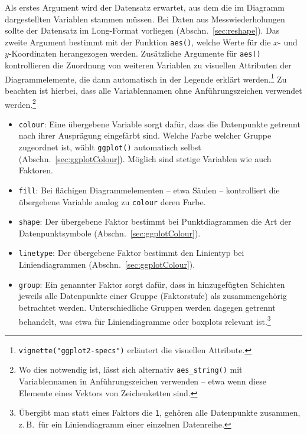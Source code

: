 Als erstes Argument wird der Datensatz erwartet, aus dem die im Diagramm dargestellten Variablen stammen müssen. Bei Daten aus Messwiederholungen sollte der Datensatz im Long-Format vorliegen (Abschn.\ \ref{sec:reshape}). Das zweite Argument bestimmt mit der Funktion \lstinline!aes()!, welche Werte für die $x$- und $y$-Koordinaten herangezogen werden. Zusätzliche Argumente für \lstinline!aes()! kontrollieren die Zuordnung von weiteren Variablen zu visuellen Attributen der Diagrammelemente, die dann automatisch in der Legende erklärt werden.\footnote{\lstinline!vignette("ggplot2-specs")! erläutert die visuellen Attribute.} Zu beachten ist hierbei, dass alle Variablennamen ohne Anführungszeichen verwendet werden.\footnote{Wo dies notwendig ist, lässt sich alternativ \lstinline!aes_string()! mit Variablennamen in Anführungszeichen verwenden -- etwa wenn diese Elemente eines Vektors von Zeichenketten sind.}
\begin{itemize}
\item \lstinline!colour!: Eine übergebene Variable sorgt dafür, dass die Datenpunkte getrennt nach ihrer Ausprägung eingefärbt sind. Welche Farbe welcher Gruppe zugeordnet ist, wählt \lstinline!ggplot()! automatisch selbst (Abschn.\ \ref{sec:ggplotColour}). Möglich sind stetige Variablen wie auch Faktoren.
\item \lstinline!fill!: Bei flächigen Diagrammelementen -- etwa Säulen -- kontrolliert die übergebene Variable analog zu \lstinline!colour! deren Farbe.
\item \lstinline!shape!: Der übergebene Faktor bestimmt bei Punktdiagrammen die Art der Datenpunktsymbole (Abschn.\ \ref{sec:ggplotColour}).
\item \lstinline!linetype!: Der übergebene Faktor bestimmt den Linientyp bei Liniendiagrammen (Abschn.\ \ref{sec:ggplotColour}).
\item \lstinline!group!: Ein genannter Faktor sorgt dafür, dass in hinzugefügten Schichten jeweils alle Datenpunkte einer Gruppe (Faktorstufe) als zusammengehörig betrachtet werden. Unterschiedliche Gruppen werden dagegen getrennt behandelt, was etwa für Liniendiagramme oder boxplots relevant ist.\footnote{Übergibt man statt eines Faktors die \lstinline!1!, gehören alle Datenpunkte zusammen, z.\,B.\ für ein Liniendiagramm einer einzelnen Datenreihe.}
\end{itemize}

